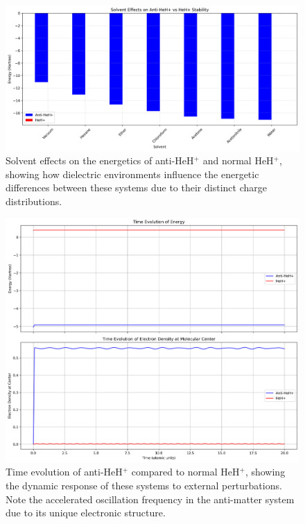 \documentclass[10pt,twocolumn,a4paper]{article}
\begin{document}
\begin{figure}[t!]
    \centering
    \includegraphics[width=\columnwidth]{graphs/corrected_solvent_effects.png}
    \caption{Solvent effects on the energetics of anti-HeH$^+$ and normal HeH$^+$, showing how dielectric environments influence the energetic differences between these systems due to their distinct charge distributions.}
    \label{fig:solvent_effects}
\end{figure}

\begin{figure}[t!]
    \centering
    \includegraphics[width=\columnwidth]{graphs/corrected_time_evolution.png}
    \caption{Time evolution of anti-HeH$^+$ compared to normal HeH$^+$, showing the dynamic response of these systems to external perturbations. Note the accelerated oscillation frequency in the anti-matter system due to its unique electronic structure.}
    \label{fig:time_evolution}
\end{figure}
\end{document}
